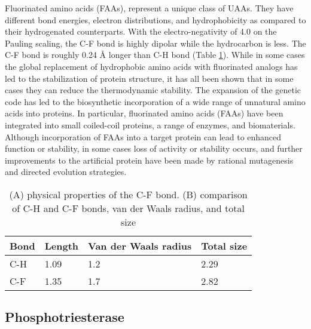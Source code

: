 \begin{refsection}
Fluorinated amino acids (FAAs), represent a unique class of UAAs. They have
different bond energies, electron distributions, and
hydrophobicity\cite{Biffinger2004} as compared to their hydrogenated
counterparts. With the electro-negativity of 4.0 on the Pauling scaling, the
C-F bond is highly dipolar while the hydrocarbon is less. The C-F bond is
roughly 0.24 {\AA} longer than C-H bond (Table
\ref{tab:c-fbond})\cite{Tang2001}. While in some cases the global replacement
of hydrophobic amino acids with fluorinated analogs has led to the
stabilization of protein structure\cite{Biffinger2004}, it has all been shown
that in some cases they can reduce the thermodynamic
stability\cite{Panchenko2006b}. The expansion of the genetic code has led to
the biosynthetic incorporation of a wide range of unnatural amino acids into
proteins\cite{Voloshchuk2010}. In particular, fluorinated amino acids (FAAs)
have been integrated into small coiled-coil
proteins\cite{Montclare2009b,Tang2001}, a range of
enzymes\cite{Voloshchuk2009,Panchenko2006b,Voloshchuk2007b,Mehta2011b,Hammill2007},
and biomaterials\cite{Yuvienco2012b}. Although incorporation of FAAs into a
target protein can lead to enhanced function or stability, in some cases loss
of activity or stability occurs, and further improvements to the artificial
protein have been made by rational mutagenesis\cite{Voloshchuk2007b} and
directed evolution strategies\cite{Montclare2006b}.
\begin{table}[h!]
\centering
\begin{tabular}{ llll }
  \hline
  Bond & Length & Van der Waals radius & Total size \\
  \hline

  C-H & 1.09 & 1.2 & 2.29 \\
  C-F & 1.35 & 1.7 & 2.82 \\

  \hline
\end{tabular}
\caption[(A) physical properties of the C-F bond. (B) comparison of C-H and C-F
bonds, van der Waals radius, and total size]{(A) physical properties of the C-F
bond. (B) comparison of C-H and C-F bonds, van der Waals radius, and total
size}\cite{Tang2001} \label{tab:c-fbond}
\end{table}

\subsection{Phosphotriesterase} 
\label{sec:pte-intro}


\end{refsection}
